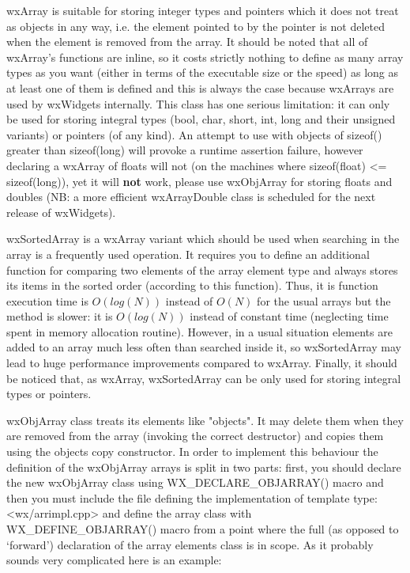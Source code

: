 wxArray is suitable for storing integer types and pointers which it does not
treat as objects in any way, i.e. the element pointed to by the pointer is not
deleted when the element is removed from the array. It should be noted that
all of wxArray's functions are inline, so it costs strictly nothing to define as
many array types as you want (either in terms of the executable size or the
speed) as long as at least one of them is defined and this is always the case
because wxArrays are used by wxWidgets internally. This class has one serious
limitation: it can only be used for storing integral types (bool, char, short,
int, long and their unsigned variants) or pointers (of any kind). An attempt
to use with objects of sizeof() greater than sizeof(long) will provoke a
runtime assertion failure, however declaring a wxArray of floats will not (on
the machines where sizeof(float) <= sizeof(long)), yet it will {\bf not} work,
please use wxObjArray for storing floats and doubles (NB: a more efficient
wxArrayDouble class is scheduled for the next release of wxWidgets).

wxSortedArray is a wxArray variant which should be used when searching in the
array is a frequently used operation. It requires you to define an additional
function for comparing two elements of the array element type and always stores
its items in the sorted order (according to this function). Thus, it is
  function execution time is $O(log(N))$ instead of
$O(N)$ for the usual arrays but the  method is
slower: it is $O(log(N))$ instead of constant time (neglecting time spent in
memory allocation routine). However, in a usual situation elements are added to
an array much less often than searched inside it, so wxSortedArray may lead to
huge performance improvements compared to wxArray. Finally, it should be
noticed that, as wxArray, wxSortedArray can be only used for storing integral
types or pointers.

wxObjArray class treats its elements like "objects". It may delete them when
they are removed from the array (invoking the correct destructor) and copies
them using the objects copy constructor. In order to implement this behaviour
the definition of the wxObjArray arrays is split in two parts: first, you should
declare the new wxObjArray class using WX\_DECLARE\_OBJARRAY() macro and then
you must include the file defining the implementation of template type:
<wx/arrimpl.cpp> and define the array class with WX\_DEFINE\_OBJARRAY() macro
from a point where the full (as opposed to `forward') declaration of the array
elements class is in scope. As it probably sounds very complicated here is an
example:


